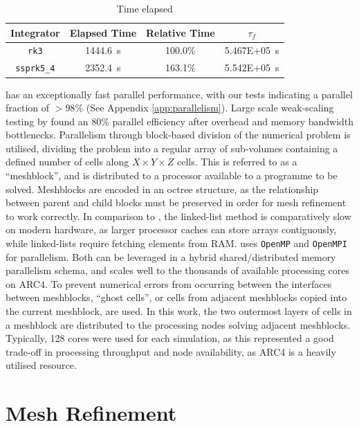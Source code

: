 \begin{table}[h]
  \centering
  \begin{tabular}{cccc}
  \hline
  Integrator & Elapsed Time & Relative Time & $\tau_f$ \\ \hline
  \texttt{rk3}       & \SI{1444.6}{\second} & 100.0\% & \SI{5.467E+05}{\second}\\
  \texttt{ssprk5\_4} & \SI{2352.4}{\second} & 163.1\% & \SI{5.542E+05}{\second}\\ \hline
  \end{tabular}
  \caption{Time elapsed}
  \label{tab:rkssprkcomparison}
\end{table}



\athena{} has an exceptionally fast parallel performance, with our tests indicating a parallel fraction of $>98\%$ (See Appendix \ref{app:parallelism}).
Large scale weak-scaling testing by \textcite{stoneAthenaAdaptiveMesh2020} found an 80\% parallel efficiency after overhead and memory bandwidth bottlenecks.
Parallelism through block-based division of the numerical problem is utilised, dividing the problem into a regular array of sub-volumes containing a defined number of cells along $X\times Y \times Z$ cells.
This is referred to as a ``meshblock'', and is distributed to a processor available to a programme to be solved.
Meshblocks are encoded in an octree structure, as the relationship between parent and child blocks must be preserved in order for mesh refinement to work correctly.
In comparison to \mg{}, the linked-list method is comparatively slow on modern hardware, as larger processor caches can store arrays contiguously, while linked-lists require fetching elements from RAM.
\athena{} uses \texttt{OpenMP} and \texttt{OpenMPI} for parallelism.
Both can be leveraged in a hybrid shared/distributed memory parallelism schema, and scales well to the thousands of available processing cores on ARC4.
To prevent numerical errors from occurring between the interfaces between meshblocks, ``ghost cells'', or cells from adjacent meshblocks copied into the current meshblock, are used.
In this work, the two outermost layers of cells in a meshblock are distributed to the processing nodes solving adjacent meshblocks.
Typically, \num{128} cores were used for each simulation, as this represented a good trade-off in processing throughput and node availability, as ARC4 is a heavily utilised resource.

\section{Mesh Refinement}
\label{sec:refinement}

